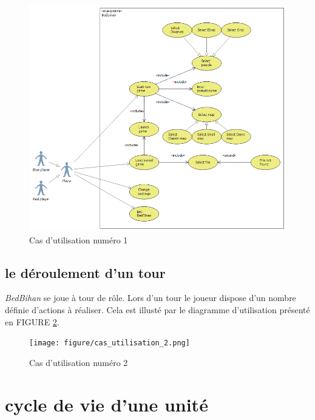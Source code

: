 		\begin{figure}
			\begin{center}
				\includegraphics[width=1\textwidth]{figure/cas_utilisation_1.png}
			\end{center}
			\caption{Cas d'utilisation numéro 1}
			\label{fig:use1}
		\end{figure}



	\subsection{le déroulement d'un tour}

		\emph{BedBihan} se joue à tour de rôle. Lors d'un tour le joueur dispose d'un nombre définie d'actions à réaliser. Cela est illusté par le diagramme d'utilisation présenté en FIGURE \ref{fig:use2}.

		\begin{figure}
			\begin{center}
				\texttt{[image: figure/cas\_utilisation\_2.png]}
			\end{center}
			\caption{Cas d'utilisation numéro 2}
			\label{fig:use2}
		\end{figure}

	\section{cycle de vie d'une unité}

